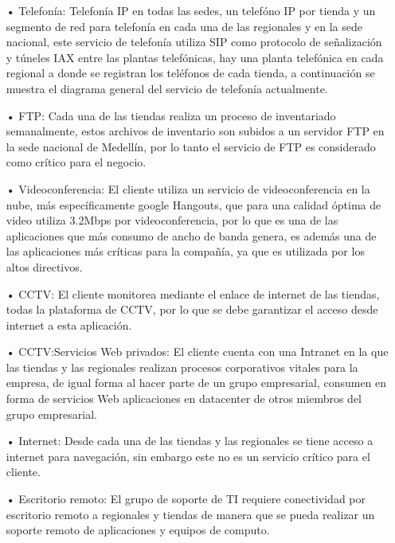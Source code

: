 \begin{itemize}
\item[•]Telefonía: Telefonía IP en todas las sedes, un telefóno IP por tienda y un segmento de red para telefonía en cada una de las regionales y en la sede nacional, este servicio de telefonía utiliza SIP como protocolo de señalización y túneles IAX entre las plantas telefónicas, hay una planta telefónica en cada regional a donde se registran los teléfonos de cada tienda, a continuación se muestra el diagrama general del servicio de telefonía actualmente.

\item[•]FTP: Cada una de las tiendas realiza un proceso de inventariado semanalmente, estos archivos de inventario son subidos a un servidor FTP en la sede nacional de Medellín, por lo tanto el servicio de FTP es considerado como crítico para el negocio.

\item[•]Videoconferencia: El cliente utiliza un servicio de videoconferencia en la nube, más específicamente google Hangouts, que para una calidad óptima de video utiliza 3.2Mbps por videoconferencia, por lo que es una de las aplicaciones que más consumo de ancho de banda genera, es además una de las aplicaciones más críticas para la compañía, ya que es utilizada por los altos directivos.

\item[•]CCTV: El cliente monitorea mediante el enlace de internet de las tiendas, todas la plataforma de CCTV, por lo que se debe garantizar el acceso desde internet a esta aplicación.

\item[•]CCTV:Servicios Web privados: El cliente cuenta con una Intranet en la que las tiendas y las regionales realizan procesos corporativos vitales para la empresa, de igual forma al hacer parte de un grupo empresarial, consumen en forma de servicios Web aplicaciones en datacenter de otros miembros del grupo empresarial.

\item[•]Internet: Desde cada una de las tiendas y las regionales se tiene acceso a internet para navegación, sin embargo este no es un servicio crítico para el cliente.

\item[•]Escritorio remoto: El grupo de soporte de TI requiere conectividad por escritorio remoto a regionales y tiendas de manera que se pueda realizar un soporte remoto de aplicaciones y equipos de computo.


\end{itemize}
